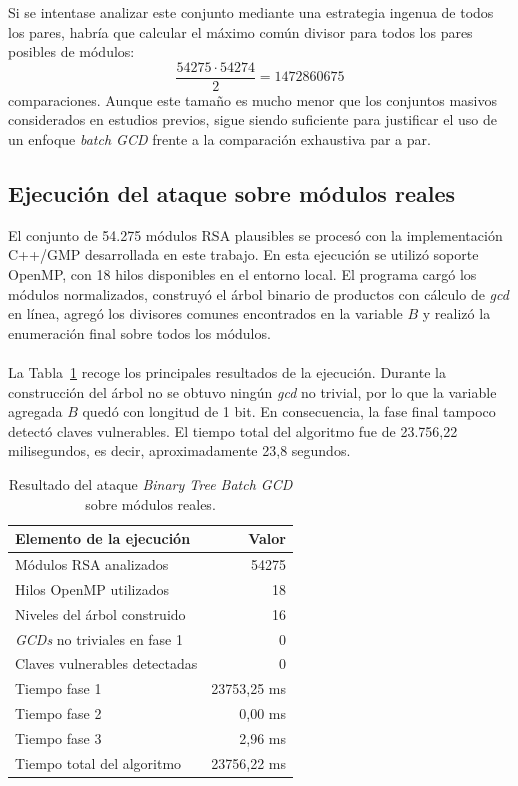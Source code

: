 Si se intentase analizar este conjunto mediante una estrategia ingenua de todos los pares, habría que calcular el máximo común divisor para todos los pares posibles de módulos:
\[
\frac{54275 \cdot 54274}{2} = 1472860675
\]
comparaciones. Aunque este tamaño es mucho menor que los conjuntos masivos considerados en estudios previos, sigue siendo suficiente para justificar el uso de un enfoque \textit{batch GCD} frente a la comparación exhaustiva par a par.

\subsection{Ejecución del ataque sobre módulos reales}

El conjunto de 54.275 módulos RSA plausibles se procesó con la implementación C++/GMP desarrollada en este trabajo. En esta ejecución se utilizó soporte OpenMP, con 18 hilos disponibles en el entorno local. El programa cargó los módulos normalizados, construyó el árbol binario de productos con cálculo de \textit{gcd} en línea, agregó los divisores comunes encontrados en la variable \(B\) y realizó la enumeración final sobre todos los módulos.
\\
\\
La Tabla~\ref{tab:ataque_real} recoge los principales resultados de la ejecución. Durante la construcción del árbol no se obtuvo ningún \textit{gcd} no trivial, por lo que la variable agregada \(B\) quedó con longitud de 1 bit. En consecuencia, la fase final tampoco detectó claves vulnerables. El tiempo total del algoritmo fue de 23.756,22 milisegundos, es decir, aproximadamente 23,8 segundos.

\begin{table}[htbp]
    \centering
    \small
    \begin{tabular}{|l|r|}
        \hline
        Elemento de la ejecución & Valor \\
        \hline
        Módulos RSA analizados & 54275 \\
        Hilos OpenMP utilizados & 18 \\
        Niveles del árbol construido & 16 \\
        \textit{GCDs} no triviales en fase 1 & 0 \\
        Claves vulnerables detectadas & 0 \\
        Tiempo fase 1 & 23753,25 ms \\
        Tiempo fase 2 & 0,00 ms \\
        Tiempo fase 3 & 2,96 ms \\
        Tiempo total del algoritmo & 23756,22 ms \\
        \hline
    \end{tabular}
    \caption{Resultado del ataque \textit{Binary Tree Batch GCD} sobre módulos reales.}
    \label{tab:ataque_real}
\end{table}

